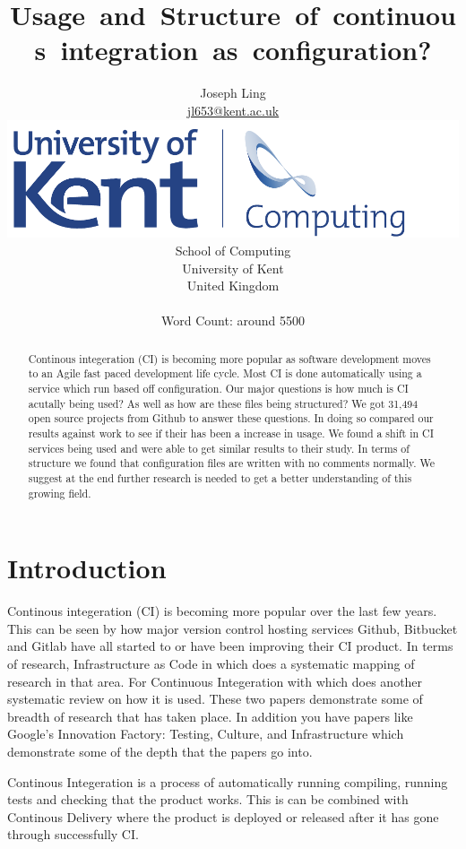 \documentclass[twoside,12pt,titlepage,a4paper]{article}
\title{Usage and Structure of continuous integration as configuration?}
\author{Joseph Ling\\\vspace{10mm}
\url{jl653@kent.ac.uk} \\ \vspace{5mm}
\includegraphics[scale=0.6]{Kent_Comp_294_RGB} \\
School of Computing \\
University of Kent \\
United Kingdom \\ \vspace{10mm} \\ Word Count: around 5500}
\begin{document}
\maketitle
\restoregeometry              %

\begin{abstract}
  Continous integeration (CI) is becoming more popular as software development moves to an Agile fast paced development life cycle. Most CI is done automatically using a service which run based off configuration. Our major questions is how much is CI acutally being used? As well as how are these files being structured? We got 31,494 open source projects from Github to answer these questions. In doing so compared our results against \citet{Hilton2016} work to see if their has been a increase in usage. We found a shift in CI services being used and were able to get similar results to their study. In terms of structure we found that configuration files are written with no comments normally. We suggest at the end further research is needed to get a better understanding of this growing field.    
\end{abstract}

\section{Introduction}
\label{Introduction}

Continous integeration (CI) is becoming more popular over the last few years. This can be seen by how major version control hosting services Github, Bitbucket and Gitlab have all started to or have been improving their CI product. In terms of research, Infrastructure as Code in \citet{Rahman2019} which does a systematic mapping of research in that area. For Continuous Integeration with \citet{Shahin2017} which does another systematic review on how it is used. These two papers demonstrate some of breadth of research that has taken place. In addition you have papers like Google's Innovation Factory: Testing, Culture, and Infrastructure \citet{Copeland2010} which demonstrate some of the depth that the papers go into.

Continous Integeration is a process of automatically running compiling, running tests and checking that the product works. This is can be combined with Continous Delivery where the product is deployed or released after it has gone through successfully CI. 
\end{document}
